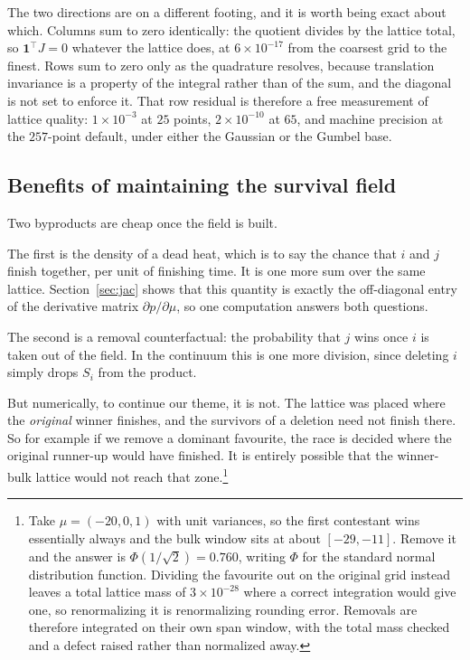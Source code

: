 \documentclass[11pt]{article}
\begin{document}
The two directions are on a different footing, and it is worth being
exact about which. Columns sum to zero identically: the quotient
divides by the lattice total, so $\mathbf{1}^{\top}J=0$ whatever the
lattice does, at $6\times10^{-17}$ from the coarsest grid to the finest.
Rows sum to zero only as the quadrature resolves, because translation
invariance is a property of the integral rather than of the sum, and the
diagonal is not set to enforce it. That row residual is therefore a
free measurement of lattice quality: $1\times10^{-3}$ at $25$ points,
$2\times10^{-10}$ at $65$, and machine precision at the $257$-point
default, under either the Gaussian or the Gumbel base.

\subsection{Benefits of maintaining the survival field}

Two byproducts are cheap once the field is built.

The first is the density of a dead heat, which is to say the chance that $i$ and $j$
finish together, per unit of finishing time. It is one more sum over the
same lattice. Section~\ref{sec:jac} shows that this quantity is exactly
the off-diagonal entry of the derivative matrix $\partial p/\partial\mu$,
so one computation answers both questions.

The second is a removal counterfactual: the probability that $j$ wins
once $i$ is taken out of the field. In the continuum this is one more
division, since deleting $i$ simply drops $S_i$ from the product.

But numerically, to continue our theme, it is not. The lattice was placed where the
\emph{original} winner finishes, and the survivors of a deletion need not
finish there. So for example if we remove a dominant favourite, the race is decided where
the original runner-up would have finished. It is entirely possible that the winner-bulk lattice would not reach that zone.\footnote{
Take $\mu=(-20,0,1)$ with unit variances, so the first contestant wins
essentially always and the bulk window sits at about $[-29,-11]$. Remove
it and the answer is $\Phi(1/\sqrt2)=0.760$, writing $\Phi$ for the
standard normal distribution function. Dividing the favourite out on the
original grid instead leaves a total lattice mass of $3\times10^{-28}$
where a correct integration would give one, so renormalizing it is
renormalizing rounding error. Removals are therefore integrated on their
own span window, with the total mass checked and a defect raised rather
than normalized away.}
\end{document}
